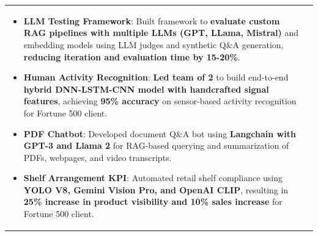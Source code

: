 \documentclass[a4paper,11pt]{article}
\begin{document}
\begin{tabularx}{\linewidth}{ @{}l r@{} }
\begin{minipage}[t]{\linewidth}
\begin{itemize}[nosep,after=\strut, leftmargin=1em, itemsep=4pt]
        \item \textbf{LLM Testing Framework}: Built framework to \textbf{evaluate custom RAG pipelines with multiple LLMs (GPT, LLama, Mistral)} and embedding models using LLM judges and synthetic Q\&A generation, \textbf{reducing iteration and evaluation time by 15-20\%}.
        \item \textbf{Human Activity Recognition}: \textbf{Led team of 2} to build end-to-end \textbf{hybrid DNN-LSTM-CNN model with handcrafted signal features}, achieving \textbf{95\% accuracy} on sensor-based activity recognition for Fortune 500 client.
        \item \textbf{PDF Chatbot}: Developed document Q\&A bot using \textbf{Langchain with GPT-3 and Llama 2} for RAG-based querying and summarization of PDFs, webpages, and video transcripts.
        \item \textbf{Shelf Arrangement KPI}: Automated retail shelf compliance using \textbf{YOLO V8, Gemini Vision Pro, and OpenAI CLIP}, resulting in \textbf{25\% increase in product visibility and 10\% sales increase} for Fortune 500 client.

\end{itemize}
\end{minipage}
\end{tabularx}
\end{document}
